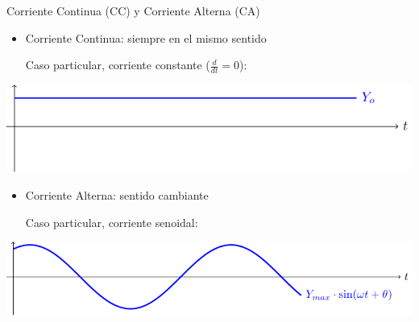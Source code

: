 \documentclass[aspectratio=169, xcolor={usenames,svgnames,dvipsnames}]{beamer}
\begin{document}
\begin{frame}{Corriente Continua (CC) y Corriente Alterna (CA)}
    \vspace{1mm}
    \begin{itemize}
        \item \alert{Corriente Continua}: siempre en el mismo sentido 

        \vspace{1mm}
        Caso particular, corriente constante \hspace{2mm}(\(\frac{d}{dt} = 0\)):
    \end{itemize}
    \begin{center}
        \includegraphics[height=0.25\textheight]{../figs/continua.pdf}
    \end{center}
    \vspace{-4mm}
    \begin{itemize}
        \item \alert{Corriente Alterna}: sentido cambiante 

        \vspace{1mm}
        Caso particular, corriente senoidal:
    \end{itemize}
    \begin{center}
        \includegraphics[height=0.25\textheight]{../figs/sin.pdf}
    \end{center}
\end{frame}

\end{document}

